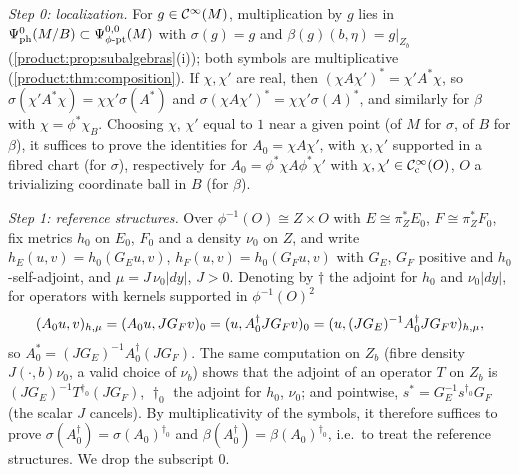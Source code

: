 \emph{Step 0: localization.} For $g\in\mathcal{C}^\infty(M)$, multiplication by $g$ lies in
$\Psi^{0}_{\mathrm{ph}}(M/B)\subset\Psi^{0,0}_{\phi\text{-}\mathrm{pt}}(M)$ with $\sigma(g)=g$ and $\beta(g)(b,\eta)=g|_{Z_b}$
(\cref{product:prop:subalgebras}(i)); both symbols are multiplicative
(\cref{product:thm:composition}). If $\chi,\chi'$ are real, then
$(\chi A\chi')^*=\chi'A^*\chi$, so
$\sigma(\chi'A^*\chi)=\chi\chi'\sigma(A^*)$ and $\sigma(\chi A\chi')^*=\chi\chi'
\sigma(A)^*$, and similarly for $\beta$ with $\chi=\phi^*\chi_B$. Choosing $\chi$,
$\chi'$ equal to $1$ near a given point (of $M$ for $\sigma$, of $B$ for $\beta$), it
suffices to prove the identities for $A_0=\chi A\chi'$, with $\chi,\chi'$ supported in
a fibred chart (for $\sigma$), respectively for $A_0=\phi^*\chi A\phi^*\chi'$ with
$\chi,\chi'\in\mathcal{C}^\infty_{\mathrm{c}}(O)$, $O$ a trivializing coordinate ball in $B$ (for $\beta$).

\emph{Step 1: reference structures.} Over $\phi^{-1}(O)\cong Z\times O$ with
$E\cong\pi_Z^*E_0$, $F\cong\pi_Z^*F_0$, fix metrics $h_0$ on $E_0$, $F_0$ and a density
$\nu_0$ on $Z$, and write $h_E(u,v)=h_0(G_Eu,v)$, $h_F(u,v)=h_0(G_Fu,v)$ with $G_E$, $G_F$
positive and $h_0$-self-adjoint, and $\mu=J\,\nu_0|dy|$, $J>0$. Denoting by $\dagger$
the adjoint for $h_0$ and $\nu_0|dy|$, for operators with kernels supported in
$\phi^{-1}(O)^2$
\begin{equation*}
( A_0u, v)_{h,\mu}=( A_0u, JG_Fv)_0=( u, A_0^\dagger JG_Fv)_0
=( u, (JG_E)^{-1}A_0^\dagger JG_Fv)_{h,\mu},
\end{equation*}
so $A_0^*=(JG_E)^{-1}A_0^\dagger(JG_F)$. The same computation on $Z_b$ (fibre density
$J(\cdot,b)\nu_0$, a valid choice of $\nu_b$) shows that the adjoint of an operator $T$
on $Z_b$ is $(JG_E)^{-1}T^{\dagger_0}(JG_F)$, $\dagger_0$ the adjoint for $h_0$,
$\nu_0$; and pointwise, $s^{*}=G_E^{-1}s^{\dagger_0}G_F$ (the scalar $J$ cancels). By
multiplicativity of the symbols, it therefore suffices to prove
$\sigma(A_0^\dagger)=\sigma(A_0)^{\dagger_0}$ and
$\beta(A_0^\dagger)=\beta(A_0)^{\dagger_0}$, i.e.\ to treat the reference structures.
We drop the subscript $0$.

